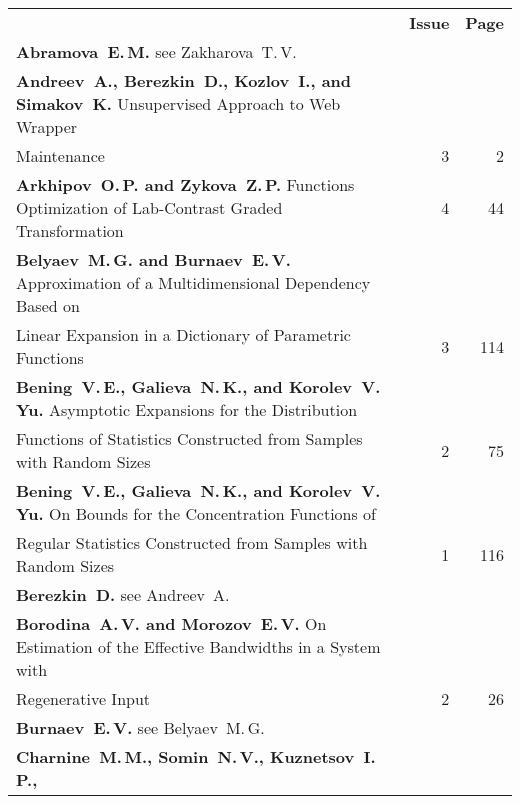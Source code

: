 {\tabcolsep=2.8pt
\begin{tabular}{p{399pt}rr}
&\textbf{Issue} & \textbf{Page}\\[6pt]
\textbf{Abramova~E.\,M.} see Zakharova~T.\,V.&&\\
\textbf{Andreev~A., Berezkin~D., Kozlov~I., and Simakov~K.}
Unsupervised Approach to Web Wrapper\linebreak
\vspace*{-12pt}\\
\hspace*{23pt}Maintenance\dotfill&3&2\\
\textbf{Arkhipov~O.\,P. and Zykova~Z.\,P.}
Functions Optimization of Lab-Contrast Graded Transformation\dotfill&4&44\\
\textbf{Belyaev~M.\,G. and Burnaev~E.\,V.}
Approximation of a Multidimensional Dependency Based on\linebreak
\vspace*{-12pt}\\
\hspace*{23pt}Linear Expansion in a Dictionary of Parametric Functions\dotfill&3&114\\
\textbf{Bening~V.\,E., Galieva~N.\,K., and Korolev~V.\,Yu.}
Asymptotic Expansions for the Distribution\linebreak
\vspace*{-12pt}\\
\hspace*{23pt}Functions of Statistics Constructed from
Samples with Random Sizes\dotfill&2&75 \\
\textbf{Bening~V.\,E., Galieva~N.\,K., and Korolev~V.\,Yu.}
On Bounds for the Concentration Functions of\linebreak
\vspace*{-12pt}\\
\hspace*{23pt}Regular Statistics Constructed from
Samples with Random Sizes\dotfill&1&116\\
\textbf{Berezkin~D.} see Andreev~A.&&\\
\textbf{Borodina~A.\,V. and Morozov~E.\,V.}
On Estimation of the Effective Bandwidths in a System with\linebreak
\vspace*{-12pt}\\
\hspace*{23pt}Regenerative Input\dotfill&2&26\\
\textbf{Burnaev~E.\,V.} see Belyaev~M.\,G. &&\\
\hangindent=23pt\noindent\textbf{Charnine~M.\,M., Somin~N.\,V., Kuznetsov~I.\,P.,
}
\end{tabular}}
